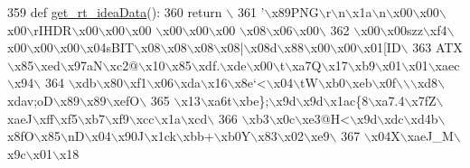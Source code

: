 \begin{DoxyCode}
359 \textcolor{keyword}{def }\hyperlink{namespaceimages_a37c278ef96ae60271be822aa05328780}{get\_rt\_ideaData}():
360     \textcolor{keywordflow}{return} \(\backslash\)
361 \textcolor{stringliteral}{'\(\backslash\)x89PNG\(\backslash\)r\(\backslash\)n\(\backslash\)x1a\(\backslash\)n\(\backslash\)x00\(\backslash\)x00\(\backslash\)x00\(\backslash\)rIHDR\(\backslash\)x00\(\backslash\)x00\(\backslash\)x00 \(\backslash\)x00\(\backslash\)x00\(\backslash\)x00 \(\backslash\)x08\(\backslash\)x06\(\backslash\)x00\(\backslash\)}
362 \textcolor{stringliteral}{\(\backslash\)x00\(\backslash\)x00szz\(\backslash\)xf4\(\backslash\)x00\(\backslash\)x00\(\backslash\)x00\(\backslash\)x04sBIT\(\backslash\)x08\(\backslash\)x08\(\backslash\)x08\(\backslash\)x08|\(\backslash\)x08d\(\backslash\)x88\(\backslash\)x00\(\backslash\)x00\(\backslash\)x01[ID\(\backslash\)}
363 \textcolor{stringliteral}{ATX\(\backslash\)x85\(\backslash\)xed\(\backslash\)x97aN\(\backslash\)xc2@\(\backslash\)x10\(\backslash\)x85\(\backslash\)xdf.\(\backslash\)xde\(\backslash\)x00\(\backslash\)t\(\backslash\)xa7Q\(\backslash\)x17\(\backslash\)xb9\(\backslash\)x01\(\backslash\)x01\(\backslash\)xaec\(\backslash\)x94\(\backslash\)}
364 \textcolor{stringliteral}{\(\backslash\)xdb\(\backslash\)x80\(\backslash\)xf1\(\backslash\)x06\(\backslash\)xda\(\backslash\)x16\(\backslash\)x8e`<\(\backslash\)x04\(\backslash\)tW\(\backslash\)xb0\(\backslash\)xeb\(\backslash\)x0f\(\backslash\)\(\backslash\)\(\backslash\)xd8\(\backslash\)xdav;oD\(\backslash\)x89\(\backslash\)x89\(\backslash\)xefO\(\backslash\)}
365 \textcolor{stringliteral}{\(\backslash\)x13\(\backslash\)xa6t\(\backslash\)xbe\};\(\backslash\)x9d\(\backslash\)x9d\(\backslash\)x1ac\{8\(\backslash\)xa7.4\(\backslash\)x7fZ\(\backslash\)xaeJ\(\backslash\)xff\(\backslash\)xf5\(\backslash\)xb7\(\backslash\)xf9\(\backslash\)xcc\(\backslash\)x1a\(\backslash\)xcd\(\backslash\)}
366 \textcolor{stringliteral}{\(\backslash\)xb3\(\backslash\)x0c\(\backslash\)xe3@H<\(\backslash\)x9d\(\backslash\)xdc\(\backslash\)xd4b\(\backslash\)x8fO\(\backslash\)x85\(\backslash\)nD\(\backslash\)x04\(\backslash\)x90J\(\backslash\)x1ck\(\backslash\)xbb+\(\backslash\)xb0Y\(\backslash\)x83\(\backslash\)x02\(\backslash\)xe9\(\backslash\)}
367 \textcolor{stringliteral}{\(\backslash\)x04X\(\backslash\)xaeJ\_M\(\backslash\)x9c\(\backslash\)x01\(\backslash\)x18%
}
\end{DoxyCode}
